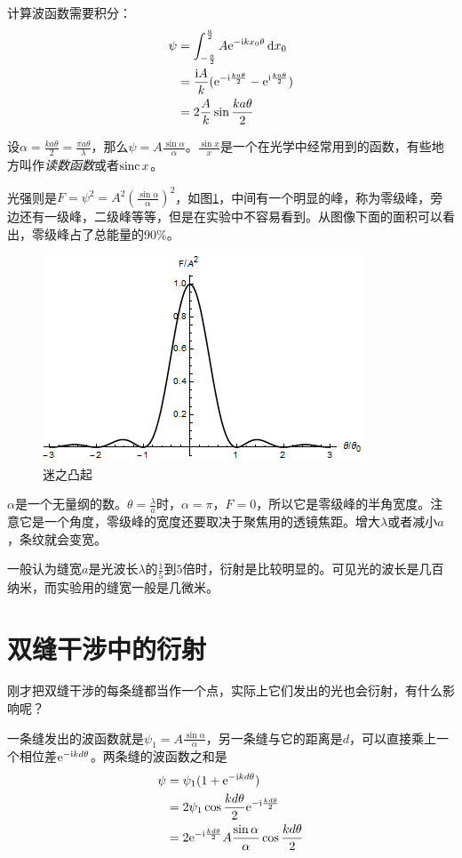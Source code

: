 计算波函数需要积分：
\begin{align*}
\psi&=\int_{-\frac{a}{2}}^{\frac{a}{2}} A \mathrm{e}^{-\mathrm{i} k x_0 \theta} \mathop{}\!\mathrm{d} x_0 \\
&=\frac{\mathrm{i} A}{k} (\mathrm{e}^{-\mathrm{i} \frac{k a \theta}{2}}-\mathrm{e}^{\mathrm{i} \frac{k a \theta}{2}}) \\
&=2 \frac{A}{k} \sin \frac{k a \theta}{2}
\end{align*}

设$\alpha=\frac{k a \theta}{2}=\frac{\pi a \theta}{\lambda}$，那么$\psi=A \frac{\sin \alpha}{\alpha}$。$\frac{\sin x}{x}$是一个在光学中经常用到的函数，有些地方叫作\emph{读数函数}或者$\mathrm{sinc}\mathop{}\! x$。

光强则是$F=\psi^2=A^2 (\frac{\sin \alpha}{\alpha})^2$，如图\ref{fig-silt-diff-plot}，中间有一个明显的峰，称为零级峰，旁边还有一级峰，二级峰等等，但是在实验中不容易看到。从图像下面的面积可以看出，零级峰占了总能量的90\%。
\begin{figure}[htb]
\centering
\includegraphics[scale=0.5]{fig/silt-diff-plot.png}
\caption{迷之凸起}
\label{fig-silt-diff-plot}
\end{figure}

$\alpha$是一个无量纲的数。$\theta=\frac{\lambda}{a}$时，$\alpha=\pi$，$F=0$，所以它是零级峰的半角宽度。注意它是一个角度，零级峰的宽度还要取决于聚焦用的透镜焦距。增大$\lambda$或者减小$a$，条纹就会变宽。

一般认为缝宽$a$是光波长$\lambda$的$\frac{1}{5}$到$5$倍时，衍射是比较明显的。可见光的波长是几百纳米，而实验用的缝宽一般是几微米。
\section{双缝干涉中的衍射}
刚才把双缝干涉的每条缝都当作一个点，实际上它们发出的光也会衍射，有什么影响呢？

一条缝发出的波函数就是$\psi_1=A \frac{\sin \alpha}{\alpha}$，另一条缝与它的距离是$d$，可以直接乘上一个相位差$\mathrm{e}^{-\mathrm{i} k d \theta}$。两条缝的波函数之和是
\begin{align*}
\psi&=\psi_1 (1+\mathrm{e}^{-\mathrm{i} k d \theta}) \\
&=2 \psi_1 \cos \frac{k d \theta}{2} \mathrm{e}^{-\mathrm{i} \frac{k d \theta}{2}} \\
&=2 \mathrm{e}^{-\mathrm{i} \frac{k d \theta}{2}} A \frac{\sin \alpha}{\alpha} \cos \frac{k d \theta}{2}
\end{align*}

